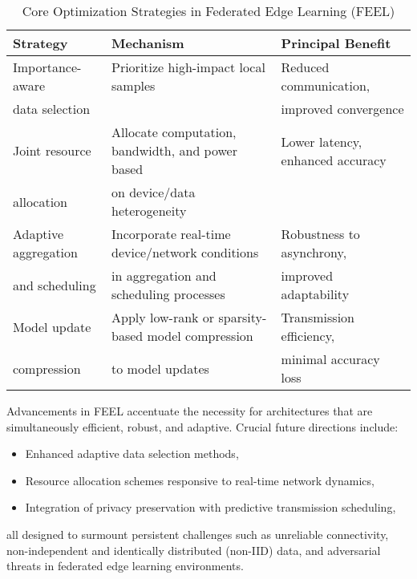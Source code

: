 \documentclass[sigconf]{acmart}
\begin{document}
\begin{table*}[htbp]
\centering
\caption{Core Optimization Strategies in Federated Edge Learning (FEEL)}
\label{tab:feel_strategies}
\begin{adjustbox}{max width=\textwidth}
\begin{tabular}{lll}
\toprule
\textbf{Strategy}    & \textbf{Mechanism}                                       & \textbf{Principal Benefit}        \\
\midrule
Importance-aware     & Prioritize high-impact local samples                     & Reduced communication,           \\
data selection       &                                                         & improved convergence             \\
Joint resource       & Allocate computation, bandwidth, and power based         & Lower latency, enhanced accuracy \\
allocation           & on device/data heterogeneity                            &                                  \\
Adaptive aggregation & Incorporate real-time device/network conditions          & Robustness to asynchrony,        \\
and scheduling       & in aggregation and scheduling processes                  & improved adaptability            \\
Model update         & Apply low-rank or sparsity-based model compression       & Transmission efficiency,         \\
compression          & to model updates                                        & minimal accuracy loss            \\
\bottomrule
\end{tabular}
\end{adjustbox}
\end{table*}

Advancements in FEEL accentuate the necessity for architectures that are simultaneously efficient, robust, and adaptive. Crucial future directions include:
\begin{itemize}
    \item Enhanced adaptive data selection methods,
    \item Resource allocation schemes responsive to real-time network dynamics,
    \item Integration of privacy preservation with predictive transmission scheduling,
\end{itemize}
all designed to surmount persistent challenges such as unreliable connectivity, non-independent and identically distributed (non-IID) data, and adversarial threats in federated edge learning environments.
\end{document}
